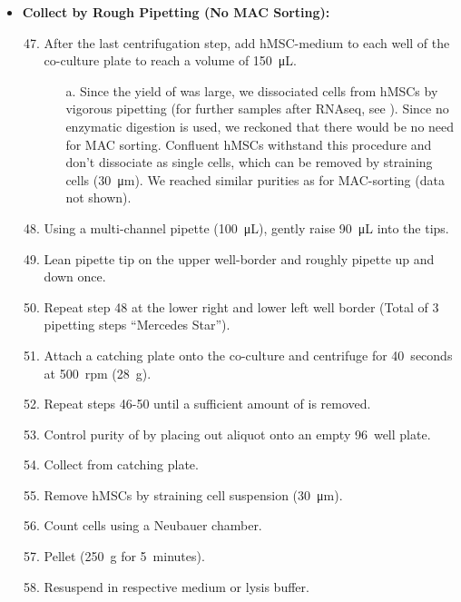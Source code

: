 \begin{itemize}
    \item \textbf{Collect \MAina by Rough Pipetting (No MAC Sorting):}
          \begin{enumerate}
              \setcounter{enumi}{46}
              \item After the last centrifugation step, add hMSC-medium to each well of the co-culture plate to reach a volume of \SI{150}{\micro\liter}.
                    \begin{itemize}
                        \item[a.] Since the yield of \MAina was large, we
                              dissociated \MAina cells from hMSCs by vigorous
                              pipetting (for further samples after RNAseq, see
                              ). Since no enzymatic
                              digestion is used, we reckoned that there would be no
                              need for MAC sorting. Confluent hMSCs withstand this
                              procedure and don't dissociate as single cells, which
                              can be removed by straining cells
                              (\SI{30}{\micro\meter}). We reached similar purities as
                              for MAC-sorting (data not shown).
                    \end{itemize}
              \item Using a multi-channel pipette (\SI{100}{\micro\liter}), gently raise \SI{90}{\micro\liter} into the tips.
              \item Lean pipette tip on the upper well-border and roughly pipette up and down once.
              \item Repeat step 48 at the lower right and lower left well border (Total of 3 pipetting steps “Mercedes Star”).
              \item Attach a catching plate onto the co-culture and centrifuge for \SI{40}{seconds} at \SI{500}{rpm} (\SI{28}{g}).
              \item Repeat steps 46-50 until a sufficient amount of \MAina is removed.
              \item Control purity of \MAina by placing out aliquot onto an empty \SI{96}{well} plate.
              \item Collect \MAina from catching plate.
              \item Remove hMSCs by straining cell suspension (\SI{30}{\micro\meter}).
              \item Count cells using a Neubauer chamber.
              \item Pellet \MAina (\SI{250}{g} for \SI{5}{minutes}).
              \item Resuspend in respective medium or lysis buffer.
          \end{enumerate}
\end{itemize}


